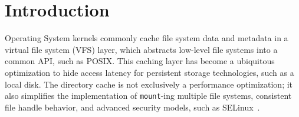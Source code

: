 \section{Introduction}
\label{sec:intro}

Operating System kernels commonly cache file system data and metadata in 
a virtual file system (VFS) layer, which abstracts low-level file systems into a common API, 
such as POSIX.  
This caching layer has become a ubiquitous optimization
to hide access latency for 
persistent storage technologies, such as a local disk.
The directory cache is not exclusively a performance optimization; it also simplifies 
the implementation of {\tt mount}-ing multiple file systems, 
consistent file handle behavior,
and advanced security 
models, such as SELinux~\cite{selinux}.







